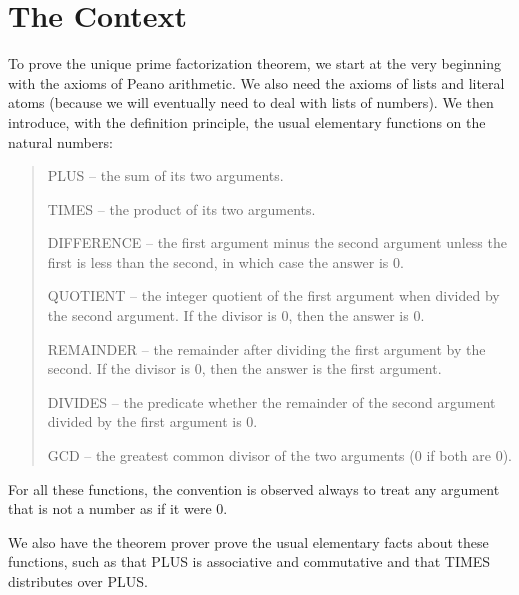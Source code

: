 \documentclass[11pt]{book}
\newenvironment{pubcrown}{\begin{quote}}{\end{quote}}
\newcommand{\pubdefaulttextsize}{\large}
\begin{document}
\section{The Context}
\label{SSCONTEXT}
\pubdefaulttextsize
To prove the unique prime factorization theorem, we start at
the very beginning with the axioms of Peano arithmetic.
We  also need the axioms of lists and literal atoms (because we
will eventually need to deal with lists of numbers).
We then introduce, with the definition principle, the
usual elementary functions on the natural numbers:
\begin{pubcrown}
PLUS -- the sum of its two arguments.

TIMES -- the product of its two arguments.

DIFFERENCE -- the first argument minus the second argument unless the
first is less than the second, in which case
the answer is 0.

QUOTIENT -- the integer quotient of the first argument when divided
by the second argument.  If the divisor is 0, then the answer is 0.

REMAINDER -- the remainder after dividing the first argument by
the second.  If the divisor is 0, then the answer is the first argument.

DIVIDES -- the predicate whether the remainder of the
second argument divided by the first argument is 0.

GCD -- the greatest common divisor of the two arguments (0 if both
are 0).
\end{pubcrown}

For all these functions, the convention is observed
always to treat any argument that is not a number as if it were 0.

We also have the theorem prover prove the usual elementary facts
about these functions, such as that PLUS is associative and commutative
and that TIMES distributes over PLUS.
\end{document}
